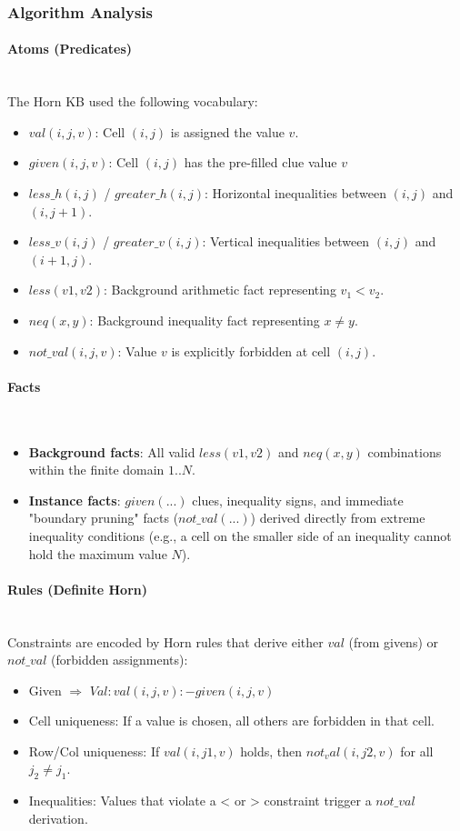 \subsubsection{Algorithm Analysis}
\paragraph{Atoms (Predicates)}~\\
The Horn KB used the following vocabulary:
\begin{itemize}
    \item $val(i,j,v)$: Cell $(i,j)$ is assigned the value $v$.
    \item $given(i,j,v)$: Cell $(i,j)$ has the pre-filled clue value $v$
    \item $less\_h(i,j)$ / $greater\_h(i,j)$: Horizontal inequalities between $(i,j)$ and $(i,j+1)$.
    \item $less\_v(i,j)$ / $greater\_v(i,j)$: Vertical inequalities between $(i,j)$ and $(i+1,j)$.
    \item $less(v1,v2)$: Background arithmetic fact representing $v_1 < v_2$.
    \item $neq(x,y)$: Background inequality fact representing $x \neq y$.
    \item $not\_val(i,j,v)$: Value $v$ is explicitly forbidden at cell $(i,j)$.
\end{itemize}

\paragraph{Facts}~
\begin{itemize}
    \item \textbf{Background facts}: All valid $less(v1,v2)$ and $neq(x,y)$ combinations within the finite domain $1..N$.
    \item \textbf{Instance facts}: $given(...)$ clues, inequality signs, and immediate "boundary pruning" facts ($not\_val(...)$) derived directly from extreme inequality conditions (e.g., a cell on the smaller side of an inequality cannot hold the maximum value $N$).
\end{itemize}

\paragraph{Rules (Definite Horn)}~\\
Constraints are encoded by Horn rules that derive either $val$ (from givens) or $not\_val$ (forbidden assignments):
\begin{itemize}
    \item Given $\Rightarrow$ $Val: val(i,j,v) :- given(i,j,v)$
    \item Cell uniqueness: If a value is chosen, all others are forbidden in that cell.
    \item Row/Col uniqueness: If $val(i,j1,v)$ holds, then $not_val(i,j2,v)$ for all $j_2 \neq j_1$.
    \item Inequalities: Values that violate a < or > constraint trigger a $not\_val$ derivation.
\end{itemize}

